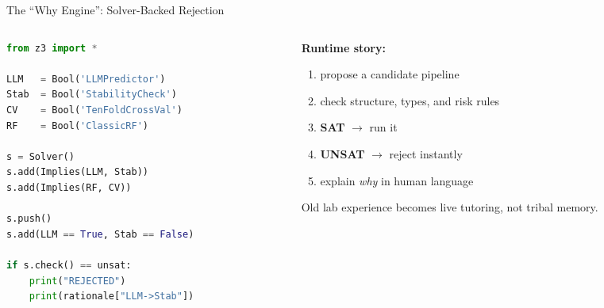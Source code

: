 \documentclass[9pt,aspectratio=169]{beamer}
\begin{document}
\begin{frame}[fragile]{The ``Why Engine'': Solver-Backed Rejection}
\begin{columns}[T]
\begin{column}{0.54\textwidth}
\begin{lstlisting}[language=Python]
from z3 import *

LLM   = Bool('LLMPredictor')
Stab  = Bool('StabilityCheck')
CV    = Bool('TenFoldCrossVal')
RF    = Bool('ClassicRF')

s = Solver()
s.add(Implies(LLM, Stab))
s.add(Implies(RF, CV))

s.push()
s.add(LLM == True, Stab == False)

if s.check() == unsat:
    print("REJECTED")
    print(rationale["LLM->Stab"])
\end{lstlisting}
\end{column}
\begin{column}{0.42\textwidth}
\small
\textbf{Runtime story:}
\begin{enumerate}
\item propose a candidate pipeline
\item check structure, types, and risk rules
\item \textbf{SAT} $\rightarrow$ run it
\item \textbf{UNSAT} $\rightarrow$ reject instantly
\item explain \emph{why} in human language
\end{enumerate}

\medskip
Old lab experience becomes live tutoring, not tribal memory.
\end{column}
\end{columns}
\end{frame}
\end{document}
